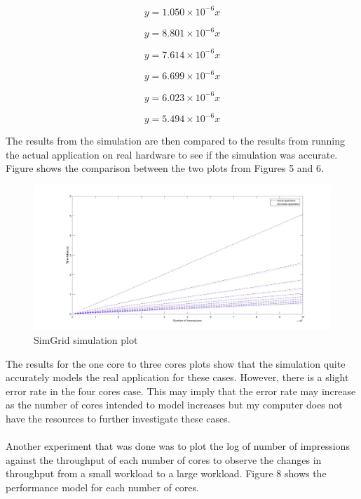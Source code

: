 \documentclass[a4paper,11pt]{article}
\begin{document}
\begin{equation}
y = 1.050\times 10^{-6}x
\end{equation}

\begin{equation}
y = 8.801\times 10^{-6}x
\end{equation}

\begin{equation}
y = 7.614\times 10^{-6}x
\end{equation}

\begin{equation}
y = 6.699\times 10^{-6}x
\end{equation}

\begin{equation}
y = 6.023\times 10^{-6}x
\end{equation}

\begin{equation}
y = 5.494\times 10^{-6}x
\end{equation}

\noindent The results from the simulation are then compared to the results from running the actual application on real hardware to see if the simulation was accurate. Figure shows the comparison between the two plots from Figures 5 and 6.

\begin{figure}[H]
	\hspace*{-2.8cm}  
	\includegraphics[scale=0.3]{images/multicore_compare}
	\caption{SimGrid simulation plot}
\end{figure}

\noindent The results for the one core to three cores plots show that the simulation quite accurately models the real application for these cases. However, there is a slight error rate in the four cores case. This may imply that the error rate may increase as the number of cores intended to model increases but my computer does not have the resources to further investigate these cases. 
\\\\
\noindent Another experiment that was done was to plot the log of number of impressions against the throughput of each number of cores to observe the changes in throughput from a small workload to a large workload. Figure 8 shows the performance model for each number of cores.
\end{document}
